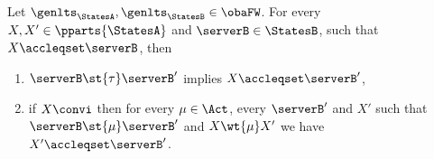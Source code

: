 \begin{lemma}
  \label{lem:bhvleqtwo-preserved}
  Let $\genlts_\StatesA, \genlts_\StatesB \in \obaFW$.
  For every
  $X, X' \in \pparts{ \StatesA }$ and $ \serverB \in \StatesB$,
  such that $X \accleqset \serverB$, then
  \begin{enumerate}
  \item\label{pt:bhvleqtwo-preserved-by-tau}
    $\serverB \st{ \tau } \serverB'$ implies $X \accleqset \serverB'$,
  \item\label{pt:bhvleqtwo-preserved-by-mu}
    if $X \convi$ then for every $\mu \in \Act$, every $\serverB'$ and $X'$ such that $\serverB \st{\mu} \serverB'$ and $X \wt{\mu} X'$
    we have $X' \accleqset \serverB'$.
  \end{enumerate}
\end{lemma}





